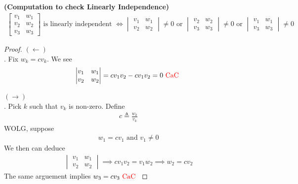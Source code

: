 \documentclass{report}
\begin{document}
\begin{theorem}
\label{CtcL}
  \textbf{(Computation to check Linearly Independence)} 
\begin{align*}
\begin{bmatrix}
  v_1 & w_1\\
  v_2 & w_2 \\
  v_3 & w_3
\end{bmatrix}\text{ is linearly independent }\iff \begin{vmatrix} 
  v_1 & w_1\\
  v_2 & w_2
\end{vmatrix}\neq 0\text{ or }\begin{vmatrix} 
  v_2 & w_2\\
  v_3 & w_3
\end{vmatrix}\neq 0\text{ or }\begin{vmatrix} 
  v_1 & w_1\\
  v_3 & w_3
\end{vmatrix}\neq 0
\end{align*}
\end{theorem}
\begin{proof}
$(\longleftarrow)$\\

. Fix $w_k=cv_k$. We see 
\begin{align*}
\begin{vmatrix} 
  v_1 & w_1 \\
  v_2 & w_2
\end{vmatrix}=cv_1v_2-cv_1v_2=0\text{ \textcolor{red}{CaC} }
\end{align*}

$(\longrightarrow)$\\

. Pick $k$ such that $v_k$ is non-zero. Define 
\begin{align*}
c\triangleq \frac{w_k}{v_k}
\end{align*}
WOLG, suppose 
\begin{align*}
w_1=cv_1\text{ and }v_1\neq 0
\end{align*}
We then can deduce
\begin{align*}
\begin{vmatrix} 
  v_1 & w_1 \\
  v_2 & w_2
\end{vmatrix}\implies cv_1v_2=v_1w_2 \implies w_2=cv_2
\end{align*}
The same arguement implies $w_3=cv_3\text{ \textcolor{red}{CaC} }$
\end{proof}
\end{document}
